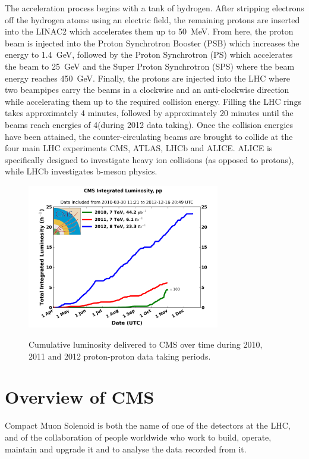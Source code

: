 The acceleration process begins with a tank of hydrogen. After stripping electrons off the hydrogen atoms
using an electric field, the remaining protons are inserted into the LINAC2 which accelerates them up to
50~MeV. From here, the proton beam is injected into the Proton Synchrotron Booster (PSB) which increases the
energy to 1.4~GeV, followed by the Proton Synchrotron (PS) which accelerates the beam to 25~GeV and the Super
Proton Synchrotron (SPS) where the beam energy reaches 450~GeV. Finally, the protons are injected into the LHC
where two beampipes carry the beams in a clockwise and an anti-clockwise direction while accelerating them
up to the required collision energy. Filling the LHC rings takes approximately 4 minutes, followed by
approximately 20 minutes until the beams reach energies of 4\TeV (during 2012 data taking). Once the collision
energies have been attained, the counter-circulating beams are brought to collide at the four main LHC
experiments CMS, ATLAS, LHCb and ALICE. ALICE is specifically designed to investigate heavy ion collisions
(as opposed to protons), while LHCb investigates b-meson physics.

\begin{figure}[hbtp]
   \centering
     \includegraphics[width=0.75\textwidth]{Chapters/03_Detector/Images/int_lumi_cumulative_pp_2.png}\\
     \caption{Cumulative luminosity delivered to CMS over time during 2010, 2011 and 2012 proton-proton data
     taking periods.}
     \label{fig:integrated_luminosity}
\end{figure}

\section{Overview of CMS}
\label{s:Overview}
Compact Muon Solenoid is both the name of one of the detectors at the LHC, and of the collaboration of
people worldwide who work to build, operate, maintain and upgrade it and to analyse the data recorded from it.

